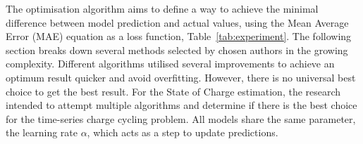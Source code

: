 The optimisation algorithm aims to define a way to achieve the minimal difference between model prediction and actual values, using the Mean Average Error (MAE) equation as a loss function, \mbox{Table~\ref{tab:experiment}}.
The following section breaks down several methods selected by chosen authors in the growing complexity.
Different algorithms utilised several improvements to achieve an optimum result quicker and avoid overfitting.
However, there is no universal best choice to get the best result.
For the State of Charge estimation, the research intended to attempt multiple algorithms and determine if there is the best choice for the time-series charge cycling problem.
All models share the same parameter, the learning rate $\alpha$, which acts as a step to update predictions.

